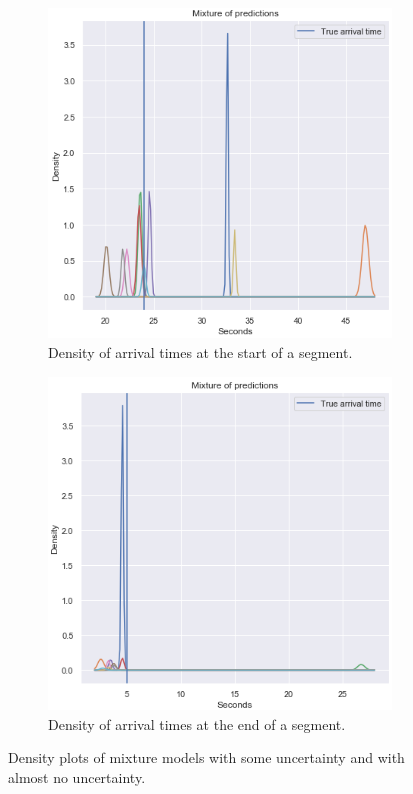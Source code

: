 \begin{figure}[H]
  \begin{subfigure}[b]{0.5\textwidth}
    \includegraphics[width=\textwidth]{figures/mixture-start-of-traj.png}
    \caption{Density of arrival times at the start of a segment.}
    \label{fig:mixture-start-of-traj}
  \end{subfigure}
  \begin{subfigure}[b]{0.5\textwidth}
    \includegraphics[width=\textwidth]{figures/mixture-end-of-traj.png}
    \caption{Density of arrival times at the end of a segment.}
    \label{fig:mixture-end-of-traj}
  \end{subfigure}
  \caption{Density plots of mixture models with some uncertainty and
    with almost no uncertainty.}
\end{figure}


